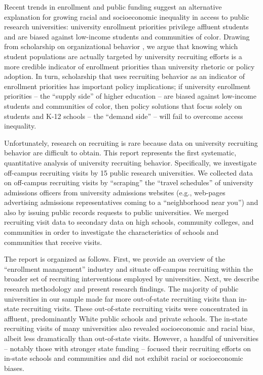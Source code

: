 \documentclass[twoside]{article}
\begin{document}
Recent trends in enrollment and public funding suggest an alternative explanation for growing racial and socioeconomic inequality in access to public  research universities: university enrollment priorities privilege affluent students and are biased against low-income students and communities of color. Drawing from scholarship on organizational behavior \citep[e.g., ][]{RN513,RN531,RN1714}, we argue that knowing which student populations are actually targeted by university recruiting efforts is a more credible indicator of enrollment priorities than university rhetoric or policy adoption. In turn, scholarship that uses recruiting behavior as an indicator of enrollment priorities has important policy implications; if university enrollment priorities -- the ``supply side'' of higher education -- are biased against low-income students and communities of color, then policy solutions that focus solely on students and K-12 schools -- the ``demand side'' -- will fail to overcome access inequality. 

Unfortunately, research on recruiting is rare because data on university recruiting behavior are difficult to obtain.  This report represents the first systematic, quantitative analysis of university recruiting behavior. Specifically, we investigate off-campus recruiting visits by 15 public research universities.  We collected data on off-campus recruiting visits by ``scraping'' the ``travel schedules'' of university admissions officers from university admissions websites (e.g., web-pages advertising admissions representatives coming to a ``neighborhood near you'') and also by issuing public records requests to public universities.  We merged recruiting visit data to secondary data on high schools, community colleges, and communities in order to investigate the characteristics of schools and communities that receive visits.  

The report is organized as follows. First, we provide an overview of the ``enrollment management'' industry and situate off-campus recruiting within the broader set of recruiting interventions employed by universities.  Next, we describe research methodology and present research findings.  The majority of public universities in our sample made far more out-of-state recruiting visits than in-state recruiting visits.  These out-of-state recruiting visits were concentrated in affluent, predominantly White public schools and private schools.  The in-state recruiting visits of many universities also revealed socioeconomic and racial bias, albeit less dramatically than out-of-state visits.  However, a handful of universities -- notably those with stronger state funding -- focused their recruiting efforts on in-state schools and communities and did not exhibit racial or socioeconomic biases.  
\end{document}
